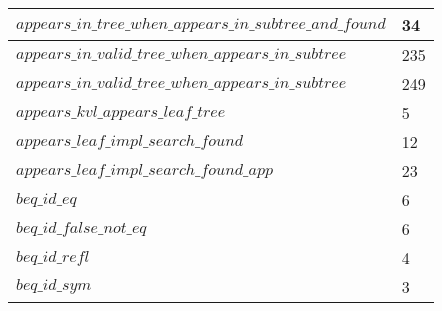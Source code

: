\begin{tabular}{| l | l |}
$appears\_in\_tree\_when\_appears\_in\_subtree\_and\_found$ & 34 \\ \hline
$appears\_in\_valid\_tree\_when\_appears\_in\_subtree$ & 235 \\ \hline
$appears\_in\_valid\_tree\_when\_appears\_in\_subtree$ & 249 \\ \hline
$appears\_kvl\_appears\_leaf\_tree$ & 5 \\ \hline
$appears\_leaf\_impl\_search\_found$ & 12 \\ \hline
$appears\_leaf\_impl\_search\_found\_app$ & 23 \\ \hline
$beq\_id\_eq$ & 6 \\ \hline
$beq\_id\_false\_not\_eq$ & 6 \\ \hline
$beq\_id\_refl$ & 4 \\ \hline
$beq\_id\_sym$ & 3 \\ \hline
\end{tabular}
\newpage
